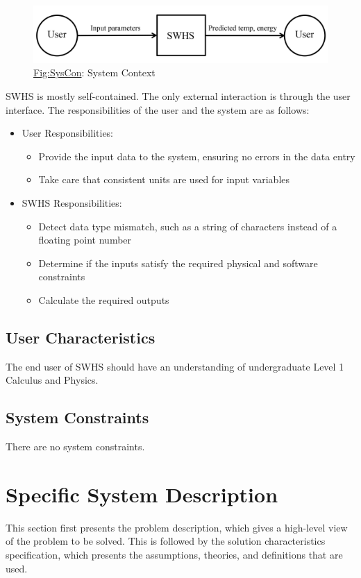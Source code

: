 \documentclass[12pt]{article}
\begin{document}
\begin{figure}
\begin{center}
\includegraphics[width=\textwidth]{../../../../datafiles/swhs/SystemContextFigure.png}
\caption{\hyperref[Figure:SysCon]{Fig:SysCon}: System Context}
\label{Figure:SysCon}
\end{center}
\end{figure}
SWHS is mostly self-contained. The only external interaction is through the user interface. The responsibilities of the user and the system are as follows:

\begin{itemize}
\item{User Responsibilities:}
\begin{itemize}
\item{Provide the input data to the system, ensuring no errors in the data entry}
\item{Take care that consistent units are used for input variables}
\end{itemize}
\item{SWHS Responsibilities:}
\begin{itemize}
\item{Detect data type mismatch, such as a string of characters instead of a floating point number}
\item{Determine if the inputs satisfy the required physical and software constraints}
\item{Calculate the required outputs}
\end{itemize}
\end{itemize}
\subsection{User Characteristics}
\label{Sec:UserChars}
The end user of SWHS should have an understanding of undergraduate Level 1 Calculus and Physics.

\subsection{System Constraints}
\label{Sec:SysConstraints}
There are no system constraints.

\section{Specific System Description}
\label{Sec:SpecSystDesc}
This section first presents the problem description, which gives a high-level view of the problem to be solved. This is followed by the solution characteristics specification, which presents the assumptions, theories, and definitions that are used.
\end{document}
